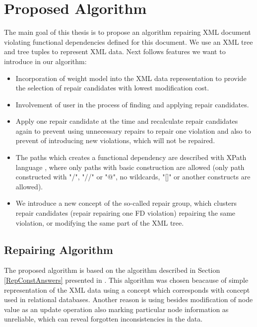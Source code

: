\chapter{Proposed Algorithm}

The main goal of this thesis is to propose an algorithm repairing XML document violating functional dependencies defined for this document. We use an XML tree and tree tuples to represent XML data. Next follows features we want to introduce in our algorithm:

\begin{itemize}
	\item Incorporation of weight model into the XML data representation to provide the selection of repair candidates with lowest modification cost.
    \item Involvement of user in the process of finding and applying repair candidates.
    \item Apply one repair candidate at the time and recalculate repair candidates again to prevent using unnecessary repairs to repair one violation and also to prevent of introducing new violations, which will not be repaired.
    \item The paths which creates a functional dependency are described with XPath language \cite{xpath}, where only paths with basic construction are allowed (only path constructed with "/", "//" or "@", no wildcards, "[]" or another constructs are allowed).
    \item We introduce a new concept of the so-called repair group, which clusters repair candidates (repair repairing one FD violation) repairing the same violation, or modifying the same part of the XML tree.
\end{itemize}


\section{Repairing Algorithm}

The proposed algorithm is based on the algorithm described in Section \ref{RepConstAnswers} presented in \cite{RepAndConsistentAnswer}. This algorithm was chosen beacause of simple representation of the XML data using a concept which corresponds with concept used in relational databases. Another reason is using besides modification of node value as an update operation also marking particular node information as unreliable, which can reveal forgotten inconsistencies in the data.

